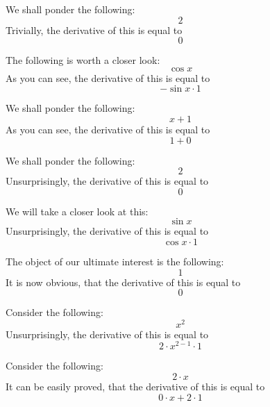 \documentclass{article}
\begin{document}
We shall ponder the following:
\begin{equation}
2 
\end{equation}
Trivially, the derivative of this is equal to
\begin{equation}
0 
\end{equation}

The following is worth a closer look:
\begin{equation}
\cos x 
\end{equation}
As you can see, the derivative of this is equal to
\begin{equation}
-\sin x \cdot 1 
\end{equation}

We shall ponder the following:
\begin{equation}
x + 1 
\end{equation}
As you can see, the derivative of this is equal to
\begin{equation}
1 + 0 
\end{equation}

We shall ponder the following:
\begin{equation}
2 
\end{equation}
Unsurprisingly, the derivative of this is equal to
\begin{equation}
0 
\end{equation}

We will take a closer look at this:
\begin{equation}
\sin x 
\end{equation}
Unsurprisingly, the derivative of this is equal to
\begin{equation}
\cos x \cdot 1 
\end{equation}

The object of our ultimate interest is the following:
\begin{equation}
1 
\end{equation}
It is now obvious, that the derivative of this is equal to
\begin{equation}
0 
\end{equation}

Consider the following:
\begin{equation}
x ^{2 } 
\end{equation}
Unsurprisingly, the derivative of this is equal to
\begin{equation}
2 \cdot x ^{2 - 1 } \cdot 1 
\end{equation}

Consider the following:
\begin{equation}
2 \cdot x 
\end{equation}
It can be easily proved, that the derivative of this is equal to
\begin{equation}
0 \cdot x + 2 \cdot 1 
\end{equation}
\end{document}
